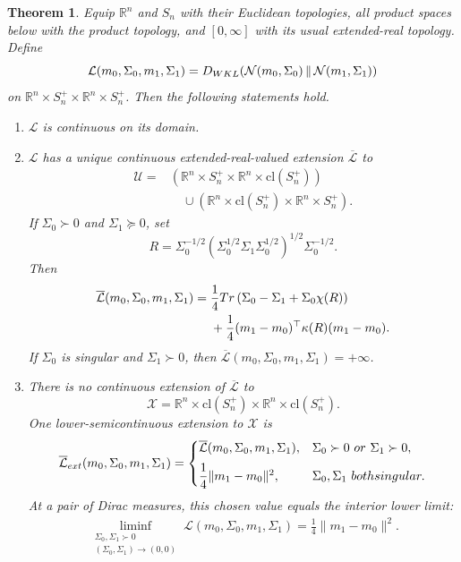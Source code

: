 \documentclass[10pt,a4paper]{amsart}
\newtheorem{theorem}{Theorem}
\newcommand{\trace}[1]{\textnormal{Tr}\left({#1}\right)}
\begin{document}
\begin{theorem}\label{theom:WKL_continuity}
Equip $\mathbb R^n$ and $S_n$ with their Euclidean topologies, all product spaces below with the product topology, and $[0,\infty]$ with its usual extended-real topology. Define
\[
\mathcal{L}(m_0,\Sigma_0,m_1,\Sigma_1)
=D_{\rm WKL}\!\left(\mathcal{N}(m_0,\Sigma_0)\,\middle\|\,\mathcal{N}(m_1,\Sigma_1)\right)
\]
on $\mathbb{R}^n\times S_n^+\times\mathbb{R}^n\times S_n^+$. Then the following statements hold.

\begin{enumerate}
\item $\mathcal{L}$ is continuous on its domain.

\item $\mathcal{L}$ has a unique continuous extended-real-valued extension $\overline{\mathcal{L}}$ to
\begin{align*}
\mathcal{U}
={}&\left(\mathbb{R}^n\times S_n^+\times\mathbb{R}^n\times\mathrm{cl}(S_n^+)\right)\\
&\quad\cup\left(\mathbb{R}^n\times\mathrm{cl}(S_n^+)\times\mathbb{R}^n\times S_n^+\right).
\end{align*}
If $\Sigma_0\succ0$ and $\Sigma_1\succeq0$, set
\[
R=\Sigma_0^{-1/2}\left(\Sigma_0^{1/2}\Sigma_1\Sigma_0^{1/2}\right)^{1/2}\Sigma_0^{-1/2}.
\]
Then
\begin{align}\label{eq:continuous_boundary_extension}
\overline{\mathcal{L}}(m_0,\Sigma_0,m_1,\Sigma_1)
={}&\frac14\trace{\Sigma_0-\Sigma_1+\Sigma_0\chi(R)}\nonumber\\
&+\frac14(m_1-m_0)^\top\kappa(R)(m_1-m_0).
\end{align}
If $\Sigma_0$ is singular and $\Sigma_1\succ0$, then $\overline{\mathcal{L}}(m_0,\Sigma_0,m_1,\Sigma_1)=+\infty$.

\item There is no continuous extension of $\overline{\mathcal{L}}$ to
\[
\mathcal{X}=\mathbb{R}^n\times\mathrm{cl}(S_n^+)\times\mathbb{R}^n\times\mathrm{cl}(S_n^+).
\]
One lower-semicontinuous extension to $\mathcal{X}$ is
\begin{align}\label{eq:lsc_extension}
\overline{\mathcal{L}}_{\rm ext}(m_0,\Sigma_0,m_1,\Sigma_1)
=\begin{cases}
\overline{\mathcal{L}}(m_0,\Sigma_0,m_1,\Sigma_1),
& \Sigma_0\succ0\ \textnormal{or}\ \Sigma_1\succ0,\\[5pt]
\dfrac14\lVert m_1-m_0\rVert^2,
& \Sigma_0,\Sigma_1\ \textnormal{both singular}.
\end{cases}
\end{align}
At a pair of Dirac measures, this chosen value equals the interior lower limit:
\begin{align}\label{eq:dirac_liminf}
\liminf_{\substack{\Sigma_0,\Sigma_1\succ0\\(\Sigma_0,\Sigma_1)\to(0,0)}}
\mathcal{L}(m_0,\Sigma_0,m_1,\Sigma_1)
=\frac14\lVert m_1-m_0\rVert^2.
\end{align}
\end{enumerate}
\end{theorem}
\end{document}
